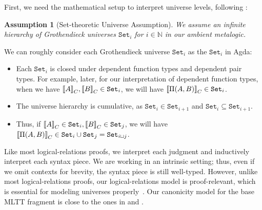 First, we need the mathematical setup to interpret universe levels, following \citet{sterling2019algebraic}:

\newcommand{\Set}[1]{\ensuremath{\texttt{Set}_{#1}}}
\newtheorem{assumption}{Assumption}[section]

\begin{assumption}[Set-theoretic Universe Assumption] We assume an infinite hierarchy of Grothendieck universes $\Set{i}$ for $i \in \mathbb{N}$ in our ambient meta\-logic.
\end{assumption}

We can roughly consider each Grothendieck universe $\Set{i}$ as the $\Set{i}$ in Agda: 
\begin{itemize}
  \item Each $\Set{i}$ is closed under dependent function types and dependent
  pair types. For example, later, for our interpretation of dependent function
  types, when we have $\denotesC{A}, \denotesC{B} \in \Set{i}$, we will have
  $\denotesC{\TyPi{A}{B}} \in \Set{i}$.
  \item The universe hierarchy is cumulative, as $\Set{i} \in \Set{i+1}$ and $\Set{i} \subseteq \Set{i+1}$.
  \item Thus, if $\denotesC{A} \in \Set{i}, \denotesC{B} \in \Set{j}$, we will
  have $\denotesC{\TyPi{A}{B}} \in \Set{i} \cup \Set{j} = \Set{i \lcup j}$.
\end{itemize}


Like most logical-relations proofs, we interpret each judgment and inductively
interpret each syntax piece. We are working in an intrinsic setting; thus, even if
we omit contexts for brevity, the syntax piece is still well-typed. However,
unlike most logical-relations proofs, our logical-relations model is proof-relevant,
which is essential for modeling universes
properly~\cite{coquand2018canonicity}.
Our canonicity model for the base MLTT fragment is close to the ones
in \citet{coquand2018canonicity} and \citet{sterling2019algebraic}.

